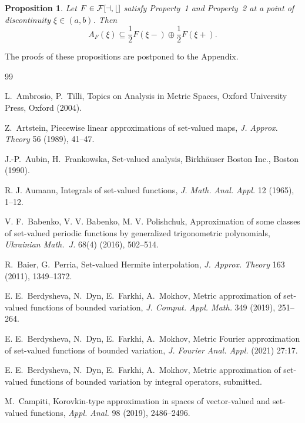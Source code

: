 \documentclass[final,3p,mathptmx]{article}%
\newcommand{\calF}{\cal{F}[a,b]}
\newtheorem{propos}[remark]{Proposition}
\begin{document}
{{{\begin{propos}\label{Propos_SecondInclusion} 
		Let $F \in \calF$ satisfy Property~1 and Property~2 at a point of discontinuity $\xi \in (a,b)$. Then 
		$$ A_F(\xi)  \subseteq \frac{1}{2} F(\xi-)\oplus \frac{1}{2} F(\xi+).$$
\end{propos}
The proofs of these propositions are postponed to the Appendix.

\medskip
 
\begin{thebibliography}{99}

L.~Ambrosio, P.~Tilli,
Topics on Analysis in Metric Spaces,
Oxford University Press, Oxford (2004).



Z.~Artstein,
Piecewise linear approximations of set-valued maps,
\textit{J. Approx. Theory} 56 (1989), 41--47.
%

J.-P.~Aubin, H.~Frankowska, Set-valued analysis, 
Birkhäuser Boston Inc., Boston (1990).
%


R. J. Aumann,
Integrals of set-valued functions, \textit{J. Math. Anal. Appl.} 12 (1965), 1--12.
%

V. F.~Babenko, V. V. Babenko, M. V. Polishchuk, 
Approximation of some classes of set-valued periodic functions by generalized trigonometric polynomials, 
\textit{Ukrainian Math.~J.} 68(4) (2016), 502--514.
%

R.~Baier,  G.~Perria, 
Set-valued Hermite interpolation,
\textit{J. Approx. Theory} 163 (2011),  1349--1372.
%

E. E.~Berdysheva, N.~Dyn, E.~Farkhi, A.~Mokhov,
Metric approximation of set-valued functions of bounded variation,
\textit{J. Comput. Appl. Math.} 349 (2019), 251--264.
%

E. E.~Berdysheva, N.~Dyn, E.~Farkhi, A.~Mokhov,
Metric Fourier approximation of set-valued functions of bounded variation,
\textit{J. Fourier Anal. Appl. }  (2021) 27:17.
%

E. E.~Berdysheva, N.~Dyn, E.~Farkhi, A.~Mokhov,
Metric approximation of set-valued functions of bounded variation by integral operators,
submitted.
%



M.~Campiti,
Korovkin-type approximation in spaces of vector-valued and set-valued functions,
\textit{Appl. Anal.} 98 (2019), 2486--2496.
%


\end{thebibliography}}}}
\end{document}
